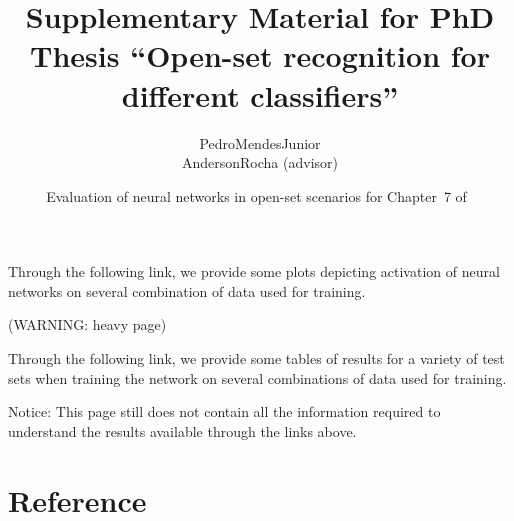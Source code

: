 

% 

\renewcommand\highlightauthorname[1]{#1}

\title{Supplementary Material for PhD Thesis ``Open-set recognition for different classifiers''}
\author{\gls{PedroMendesJunior}\\%
  \gls{AndersonRocha} (advisor)\\%
}
\date{Evaluation of neural networks in open-set scenarios for Chapter~7 of~}



\maketitle


Through the following link, we provide some plots depicting activation of neural networks on several combination of data used for training.

\begin{center}
   (WARNING: heavy page)
\end{center}

Through the following link, we provide some tables of results for a variety of test sets when training the network on several combinations of data used for training.

\begin{center}
\end{center}

Notice: This page still does not contain all the information required to understand the results available through the links above.

\section*{Reference}

\begin{publications}
  \\

\end{publications}




